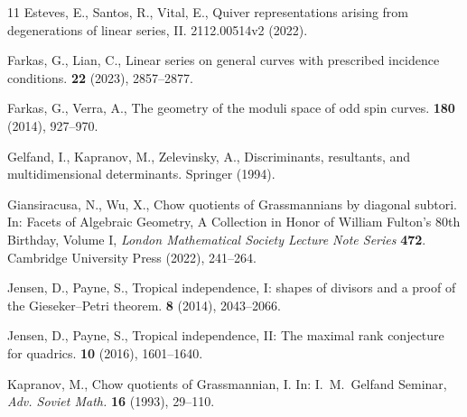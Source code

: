 \documentclass[a4paper,11pt]{amsart}
\theoremstyle{plain}
\theoremstyle{definition}
\theoremstyle{remark}
\begin{document}
\begin{thebibliography}{11}
Esteves, E., Santos, R., Vital, E., 
\newblock Quiver representations arising from degenerations of linear series, II. 
 2112.00514v2 (2022).


Farkas, G., Lian, C.,
\newblock Linear series on general curves with prescribed incidence conditions.
 \textbf{22} (2023), 2857--2877.

Farkas, G., Verra, A.,
\newblock The geometry of the moduli space of odd spin curves.
 \textbf{180} (2014), 927--970.

Gelfand, I., Kapranov, M., Zelevinsky, A.,
\newblock Discriminants, resultants, and multidimensional determinants. Springer (1994).

Giansiracusa, N., Wu, X.,
\newblock Chow quotients of {G}rassmannians by diagonal subtori.
\newblock \newblock In: Facets of Algebraic Geometry, A Collection in Honor of William Fulton's 80th Birthday, Volume I, {\em London Mathematical Society Lecture Note Series} \textbf{ 472}. Cambridge University Press (2022), 241--264. 




Jensen, D., Payne, S.,
\newblock Tropical independence, I: shapes of divisors and a proof of the Gieseker--Petri theorem.
 \textbf{8} (2014), 2043--2066.

Jensen, D., Payne, S.,
\newblock Tropical independence, II: The maximal rank conjecture for quadrics.
 \textbf{10} (2016), 1601--1640.

Kapranov, M.,
\newblock Chow quotients of {G}rassmannian, {I}.
\newblock In: I.~M.~Gelfand Seminar, {\em Adv. Soviet Math.} \textbf{16} (1993), 29--110.



\end{thebibliography}
\end{document}
